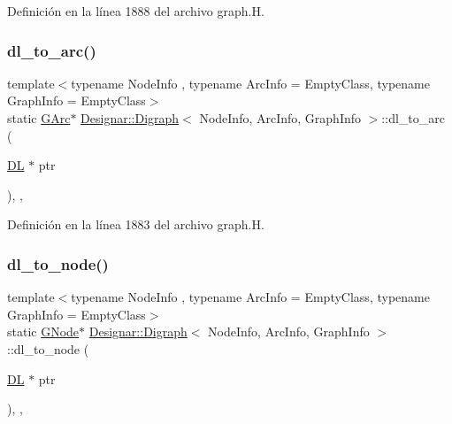 Definición en la línea 1888 del archivo graph.\+H.

\mbox{\label{class_designar_1_1_digraph_af9581e9d0825da11ce153bd055149f7f}} 
\subsubsection{\texorpdfstring{dl\+\_\+to\+\_\+arc()}{dl\_to\_arc()}}
{\footnotesize\ttfamily template$<$typename Node\+Info , typename Arc\+Info  = Empty\+Class, typename Graph\+Info  = Empty\+Class$>$ \\
static \hyperlink{class_designar_1_1_digraph_a341acf8fb0195a8986158c29c4db1a89}{G\+Arc}$\ast$ \hyperlink{class_designar_1_1_digraph}{Designar\+::\+Digraph}$<$ Node\+Info, Arc\+Info, Graph\+Info $>$\+::dl\+\_\+to\+\_\+arc (\begin{DoxyParamCaption}\item[{\hyperlink{class_designar_1_1_d_l}{DL} $\ast$}]{ptr }\end{DoxyParamCaption})\hspace{0.3cm}{\ttfamily [inline]}, {\ttfamily [static]}, {\ttfamily [protected]}}



Definición en la línea 1883 del archivo graph.\+H.

\mbox{\label{class_designar_1_1_digraph_adbb91274c17d6087fdd5721e3f9b1f7c}} 
\subsubsection{\texorpdfstring{dl\+\_\+to\+\_\+node()}{dl\_to\_node()}}
{\footnotesize\ttfamily template$<$typename Node\+Info , typename Arc\+Info  = Empty\+Class, typename Graph\+Info  = Empty\+Class$>$ \\
static \hyperlink{class_designar_1_1_digraph_a33b0d2b8820ada501522b0e67e63524a}{G\+Node}$\ast$ \hyperlink{class_designar_1_1_digraph}{Designar\+::\+Digraph}$<$ Node\+Info, Arc\+Info, Graph\+Info $>$\+::dl\+\_\+to\+\_\+node (\begin{DoxyParamCaption}\item[{\hyperlink{class_designar_1_1_d_l}{DL} $\ast$}]{ptr }\end{DoxyParamCaption})\hspace{0.3cm}{\ttfamily [inline]}, {\ttfamily [static]}, {\ttfamily [protected]}}



